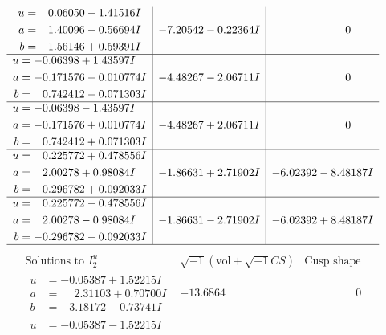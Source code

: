 \documentclass[1p]{elsarticle_modified}
\theoremstyle{definition}
\newcommand{\I}{\sqrt{-1}}
\begin{document}
$$\begin{array}{c|c|c}
\begin{aligned}
u &= \phantom{-}0.06050 - 1.41516 I \\
a &= \phantom{-}1.40096 - 0.56694 I \\
b &= -1.56146 + 0.59391 I\end{aligned}
 & -7.20542 - 0.22364 I & \phantom{-0.000000 } 0 \\ \hline\begin{aligned}
u &= -0.06398 + 1.43597 I \\
a &= -0.171576 - 0.010774 I \\
b &= \phantom{-}0.742412 - 0.071303 I\end{aligned}
 & -4.48267 - 2.06711 I & \phantom{-0.000000 } 0 \\ \hline\begin{aligned}
u &= -0.06398 - 1.43597 I \\
a &= -0.171576 + 0.010774 I \\
b &= \phantom{-}0.742412 + 0.071303 I\end{aligned}
 & -4.48267 + 2.06711 I & \phantom{-0.000000 } 0 \\ \hline\begin{aligned}
u &= \phantom{-}0.225772 + 0.478556 I \\
a &= \phantom{-}2.00278 + 0.98084 I \\
b &= -0.296782 + 0.092033 I\end{aligned}
 & -1.86631 + 2.71902 I & -6.02392 - 8.48187 I \\ \hline\begin{aligned}
u &= \phantom{-}0.225772 - 0.478556 I \\
a &= \phantom{-}2.00278 - 0.98084 I \\
b &= -0.296782 - 0.092033 I\end{aligned}
 & -1.86631 - 2.71902 I & -6.02392 + 8.48187 I\\
 \hline 
 \end{array}$$\newpage$$\begin{array}{c|c|c}  
\text{Solutions to }I^u_{2}& \I (\text{vol} + \sqrt{-1}CS) & \text{Cusp shape}\\
 \hline 
\begin{aligned}
u &= -0.05387 + 1.52215 I \\
a &= \phantom{-}2.31103 + 0.70700 I \\
b &= -3.18172 - 0.73741 I\end{aligned}
 & -13.6864\phantom{ +0.000000I} & \phantom{-0.000000 } 0 \\ \hline\begin{aligned}
u &= -0.05387 - 1.52215 I \\

\end{aligned}
\end{array}$$
\end{document}
